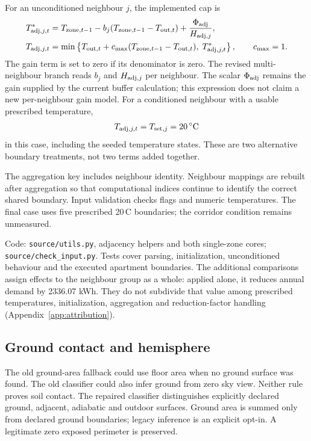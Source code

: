 For an unconditioned neighbour $j$, the implemented cap is
\begin{align}
T^*_{{\rm adj},j,t}&=T_{{\rm zone},t-1}
-b_j(T_{{\rm zone},t-1}-T_{{\rm out},t})
+\frac{\Phi_{\rm adj}}{H_{{\rm adj},j}},\\
T_{{\rm adj},j,t}&=\min\left\{
T_{{\rm out},t}+c_{\max}(T_{{\rm zone},t-1}-T_{{\rm out},t}),\;
T^*_{{\rm adj},j,t}\right\},\qquad c_{\max}=1.
\end{align}
The gain term is set to zero if its denominator is zero. The revised multi-neighbour branch reads $b_j$ and $H_{{\rm adj},j}$ per neighbour. The scalar $\Phi_{\rm adj}$ remains the gain supplied by the current buffer calculation; this expression does not claim a new per-neighbour gain model.
For a conditioned neighbour with a usable prescribed temperature,
\begin{equation}
T_{{\rm adj},j,t}=T_{{\rm set},j}=20\,{}^{\circ}\mathrm{C}
\end{equation}
in this case, including the seeded temperature states. These are two alternative boundary treatments, not two terms added together.

The aggregation key includes neighbour identity. Neighbour mappings are rebuilt after aggregation so that computational indices continue to identify the correct shared boundary. Input validation checks flags and numeric temperatures. The final case uses five prescribed 20\,\textdegree C boundaries; the corridor condition remains unmeasured.

Code: \nolinkurl{source/utils.py}, adjacency helpers and both single-zone cores; \nolinkurl{source/check_input.py}. Tests cover parsing, initialization, unconditioned behaviour and the executed apartment boundaries. The additional comparisons assign effects to the neighbour group as a whole: applied alone, it reduces annual demand by 2336.07 kWh. They do not subdivide that value among prescribed temperatures, initialization, aggregation and reduction-factor handling (Appendix~\ref{app:attribution}).

\subsection{Ground contact and hemisphere}
\label{app:ground}
The old ground-area fallback could use floor area when no ground surface was found. The old classifier could also infer ground from zero sky view. Neither rule proves soil contact. The repaired classifier distinguishes explicitly declared ground, adjacent, adiabatic and outdoor surfaces. Ground area is summed only from declared ground boundaries; legacy inference is an explicit opt-in. A legitimate zero exposed perimeter is preserved.

